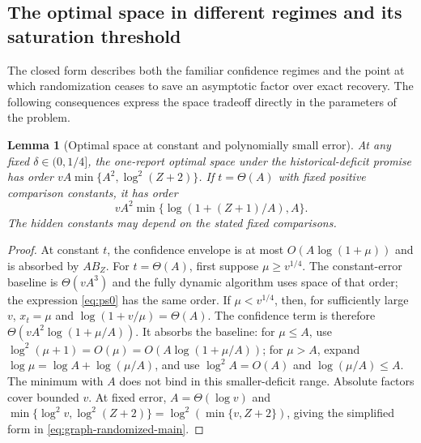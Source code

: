 \documentclass[11pt,letterpaper]{article}
\newtheorem{lemma}[theorem]{Lemma}
\numberwithin{equation}{section}
\begin{document}
\subsection{The optimal space in different regimes and its saturation threshold}
\label{sec:parameter-consequences}

The closed form describes both the familiar confidence regimes and the point at which randomization ceases to save an asymptotic factor over exact recovery.
The following consequences express the space tradeoff directly in the parameters of the problem.

\begin{lemma}[Optimal space at constant and polynomially small error]
\label{lem:familiar-regimes}
At any fixed $\delta\in(0,1/4]$, the one-report optimal space under the historical-deficit promise has order $vA\min\{A^2,\log^2(Z+2)\}$.
If $t=\Theta(A)$ with fixed positive comparison constants, it has order
\begin{equation}
vA^2\min\{\log(1+(Z+1)/A),A\}. \label{eq:ps0}
\end{equation}
The hidden constants may depend on the stated fixed comparisons.
\end{lemma}
\begin{proof}
At constant $t$, the confidence envelope is at most $O(A\log(1+\mu))$ and is absorbed by $AB_Z$.
For $t=\Theta(A)$, first suppose $\mu\ge v^{1/4}$.
The constant-error baseline is $\Theta(vA^3)$ and the fully dynamic algorithm uses space of that order; the expression \eqref{eq:ps0} has the same order.
If $\mu<v^{1/4}$, then, for sufficiently large $v$, $x_t=\mu$ and $\log(1+v/\mu)=\Theta(A)$.
The confidence term is therefore $\Theta(vA^2\log(1+\mu/A))$.
It absorbs the baseline: for $\mu\le A$, use $\log^2(\mu+1)=O(\mu)=O(A\log(1+\mu/A))$; for $\mu>A$, expand $\log\mu=\log A+\log(\mu/A)$, and use $\log^2 A=O(A)$ and $\log(\mu/A)\le A$.
The minimum with $A$ does not bind in this smaller-deficit range.
Absolute factors cover bounded $v$.
At fixed error, $A=\Theta(\log v)$ and $\min\{\log^2v,\log^2(Z+2)\}=\log^2(\min\{v,Z+2\})$, giving the simplified form in \eqref{eq:graph-randomized-main}.
\end{proof}
\end{document}
